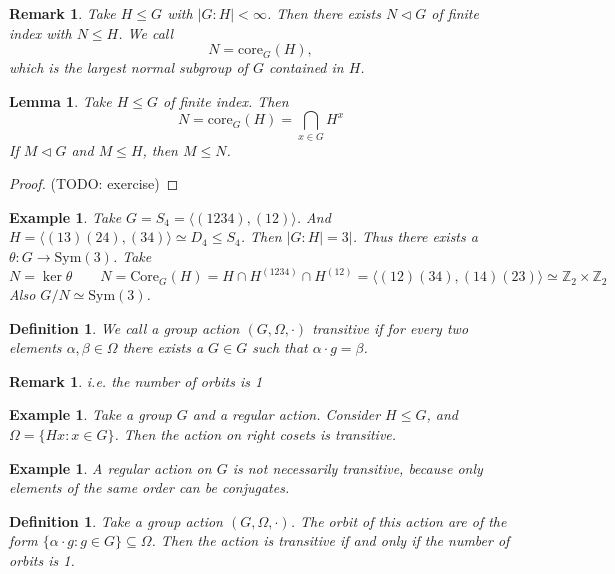 \documentclass[a4paper,10pt]{article}
\newcommand{\ZZ}{\mathbb{Z}}
\newtheorem{Def}[thm]{Definition}
\newtheorem{eg}[thm]{Example}
\newtheorem{Lem}[thm]{Lemma}
\newtheorem{rem}[thm]{Remark}
\begin{document}
\begin{rem}
Take $H \leq G$ with $|G:H| < \infty$. Then there exists $N \triangleleft G$ of finite index with $N \leq H$. We call
\[ N = \text{core}_G(H), \]
which is the largest normal subgroup of $G$ contained in $H$. 
\end{rem}

\begin{Lem}
Take $H \leq G$ of finite index. Then
\[ N = \text{core}_G(H) = \bigcap_{x \in G} H^x \]
If $M \triangleleft G$ and $M \leq H$, then $M \leq N$.
\end{Lem}
\begin{proof}
(TODO: exercise)
\end{proof}

\begin{eg}
Take $G = S_4 = \langle (1234), (12) \rangle$. And $H = \langle (13)(24), (34) \rangle \simeq D_4 \leq S_4$. Then $|G:H| = 3|$. Thus there exists a $\theta : G \rightarrow \text{Sym} (3)$. Take
\[ N = \ker \theta \qquad N = \text{Core}_G(H) = H \cap H^{(1234)} \cap H^{(12)} = \langle (12)(34), (14)(23) \rangle \simeq \ZZ_2 \times \ZZ_2 \]
Also $G / N \simeq \text{Sym}(3)$.
\end{eg}


\begin{Def}
We call a group action $(G, \Omega, \cdot)$ transitive if for every two elements $\alpha, \beta \in \Omega$ there exists a $G \in G$ such that $\alpha \cdot g = \beta$. 
\end{Def}
\begin{rem}
i.e. the number of orbits is 1
\end{rem}


\begin{eg}
Take a group $G$ and a regular action. Consider $H \leq G$, and $\Omega = \{ Hx : x \in G \}$. Then the action on right cosets is transitive. 
\end{eg}

\begin{eg}
A regular action on $G$ is not necessarily transitive, because only elements of the same order can be conjugates.
\end{eg}

\begin{Def}
Take a group action $(G, \Omega, \cdot)$. The orbit of this action are of the form $ \{ \alpha \cdot g : g \in G \} \subseteq \Omega$.
Then the action is transitive if and only if the number of orbits is 1.
\end{Def}
\end{document}
